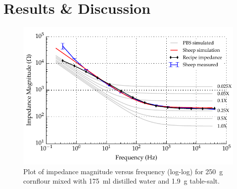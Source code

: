 
\section{Results \& Discussion}

  \begin{figure}
    \centering
    \includegraphics[width=\textwidth]{content/pt2/graphics/run14_175ml-distilledWater_250g-cornflour_1g9-salt_ZVsF_graph_mag}
    \caption{\label{fig:recipe_cornflour_salt_mag}Plot of impedance magnitude versus frequency (log-log) for \SI{250}{\gram} cornflour mixed with \SI{175}{\milli\litre} distilled water and \SI{1.9}{\gram} table-salt.}
  \end{figure}

